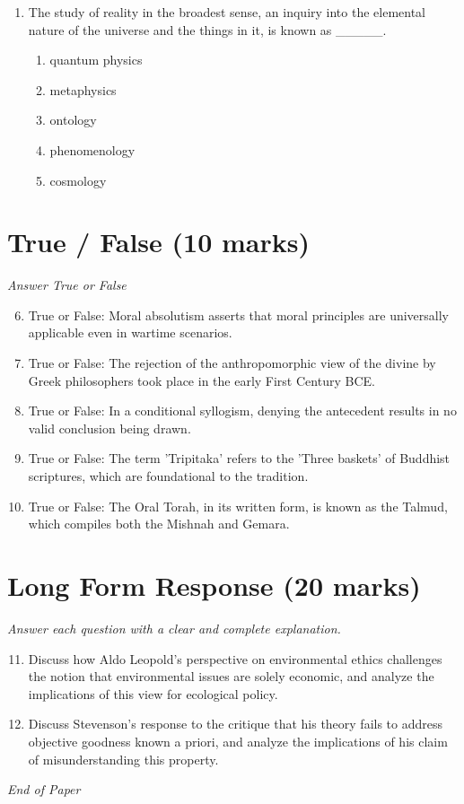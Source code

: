 \documentclass[12pt]{article}
\begin{document}
\begin{enumerate}[label=\arabic*.]
\begin{enumerate}[label=(\alph*)]
    \item the effects of engineering children to have positional goods
    \item loss of equality of opportunity
    \item increased disparity between the rich and the poor
\end{enumerate}
\item The study of reality in the broadest sense, an inquiry into the elemental nature of the universe and the things in it, is known as \_\_\_\_\_.
\begin{enumerate}[label=(\alph*)]
    \item quantum physics
    \item metaphysics
    \item ontology
    \item phenomenology
    \item cosmology
\end{enumerate}
\end{enumerate}

\section*{True / False (10 marks)}
\textit{Answer True or False}
\begin{enumerate}[label=\arabic*.]
\setcounter{enumi}{5}
\item True or False: Moral absolutism asserts that moral principles are universally applicable even in wartime scenarios.
\item True or False: The rejection of the anthropomorphic view of the divine by Greek philosophers took place in the early First Century BCE.
\item True or False: In a conditional syllogism, denying the antecedent results in no valid conclusion being drawn.
\item True or False: The term 'Tripitaka' refers to the 'Three baskets' of Buddhist scriptures, which are foundational to the tradition.
\item True or False: The Oral Torah, in its written form, is known as the Talmud, which compiles both the Mishnah and Gemara.
\end{enumerate}

\section*{Long Form Response (20 marks)}
\textit{Answer each question with a clear and complete explanation.}
\begin{enumerate}[label=\arabic*.]
\setcounter{enumi}{10}
\item Discuss how Aldo Leopold's perspective on environmental ethics challenges the notion that environmental issues are solely economic, and analyze the implications of this view for ecological policy.
\item Discuss Stevenson's response to the critique that his theory fails to address objective goodness known a priori, and analyze the implications of his claim of misunderstanding this property.
\end{enumerate}

\vfill
\noindent\textit{End of Paper}
\end{document}
